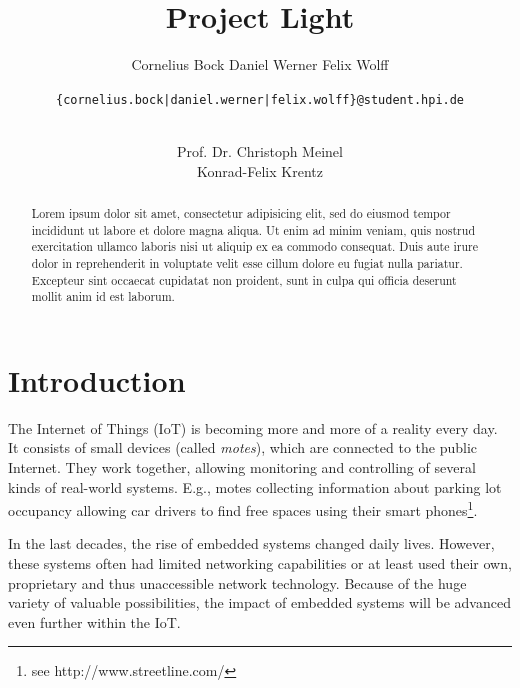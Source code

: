 \documentclass{sig-alternate} %
\begin{document}
\title{Project Light}


\author{
\alignauthor
Cornelius Bock
%
\alignauthor
Daniel Werner
%
\alignauthor
Felix Wolff
%
\and
\texttt{\{cornelius.bock|daniel.werner|felix.wolff\}@student.hpi.de} \\ \\
\and
\alignauthor
Prof. Dr. Christoph Meinel\\
%
\alignauthor
Konrad-Felix Krentz\\
}

\maketitle

\begin{abstract}
Lorem ipsum dolor sit amet, consectetur adipisicing elit, sed do eiusmod
tempor incididunt ut labore et dolore magna aliqua. Ut enim ad minim veniam,
quis nostrud exercitation ullamco laboris nisi ut aliquip ex ea commodo
consequat. Duis aute irure dolor in reprehenderit in voluptate velit esse
cillum dolore eu fugiat nulla pariatur. Excepteur sint occaecat cupidatat non
proident, sunt in culpa qui officia deserunt mollit anim id est laborum.
\end{abstract}




\section{Introduction}
\label{sec:introduction}

The Internet of Things (IoT) is becoming more and more of a reality every day.
It consists of small devices (called \textit{motes}), which are connected to the public Internet.
They work together, allowing monitoring and controlling of several kinds of real-world systems. %
E.g., motes collecting information about parking lot occupancy allowing car drivers to find free spaces using their smart phones\footnote{see http://www.streetline.com/}.

In the last decades, the rise of embedded systems changed daily lives. %
However, these systems often had limited networking capabilities or at least used their own, proprietary and thus unaccessible network technology.
Because of the huge variety of valuable possibilities, the impact of embedded systems will be advanced even further within the IoT.
\end{document}
